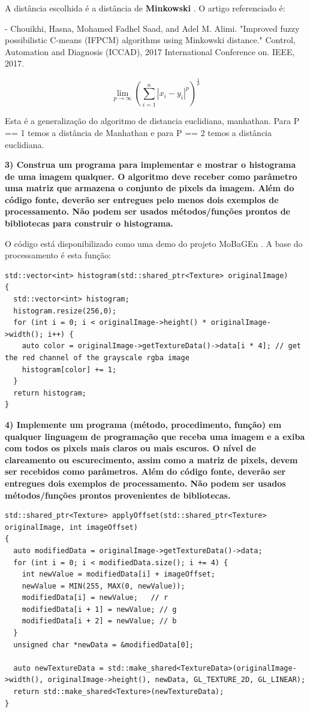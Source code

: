 \documentclass[a4paper]{sbgames}               %
\begin{document}
A distância escolhida é a distância de \textbf{Minkowski} \cite{chouikhi2017improved}. O artigo referenciado é:

- Chouikhi, Hasna, Mohamed Fadhel Saad, and Adel M. Alimi. "Improved fuzzy possibilistic C-means (IFPCM) algorithms using Minkowski distance." Control, Automation and Diagnosis (ICCAD), 2017 International Conference on. IEEE, 2017.

$$ \lim_{p\to\infty}{\left(\sum_{i=1}^n |x_i-y_i|^p\right)^\frac{1}{p}} $$

Esta é a generalização do algoritmo de distancia euclidiana, manhathan. Para P == 1 temos a distância de Manhathan e para P == 2 temos a distância euclidiana.

\textbf{3) Construa um programa para implementar e mostrar o histograma de uma imagem qualquer. O algoritmo deve receber como parâmetro uma matriz que armazena o conjunto de pixels da imagem. Além do código fonte, deverão ser entregues pelo menos dois exemplos de processamento. Não podem ser usados métodos/funções prontos de bibliotecas para construir o histograma.}

O código está disponibilizado como uma demo do projeto MoBaGEn \cite{Tolstenko2018}. A base do processamento é esta função:
\pagebreak
\begin{lstlisting}
std::vector<int> histogram(std::shared_ptr<Texture> originalImage)
{
  std::vector<int> histogram;
  histogram.resize(256,0);
  for (int i = 0; i < originalImage->height() * originalImage->width(); i++) {
    auto color = originalImage->getTextureData()->data[i * 4]; // get the red channel of the grayscale rgba image
    histogram[color] += 1;
  }
  return histogram;
}
\end{lstlisting}

\textbf{4) Implemente um programa (método, procedimento, função) em qualquer
linguagem de programação que receba uma imagem e a exiba com todos
os pixels mais claros ou mais escuros. O nível de clareamento ou
escurecimento, assim como a matriz de pixels, devem ser recebidos
como parâmetros. Além do código fonte, deverão ser entregues dois
exemplos de processamento. Não podem ser usados métodos/funções
prontos provenientes de bibliotecas.}

\begin{lstlisting}
std::shared_ptr<Texture> applyOffset(std::shared_ptr<Texture> originalImage, int imageOffset)
{
  auto modifiedData = originalImage->getTextureData()->data;
  for (int i = 0; i < modifiedData.size(); i += 4) {
    int newValue = modifiedData[i] + imageOffset;
    newValue = MIN(255, MAX(0, newValue));
    modifiedData[i] = newValue;   // r
    modifiedData[i + 1] = newValue; // g
    modifiedData[i + 2] = newValue; // b
  }
  unsigned char *newData = &modifiedData[0];

  auto newTextureData = std::make_shared<TextureData>(originalImage->width(), originalImage->height(), newData, GL_TEXTURE_2D, GL_LINEAR);
  return std::make_shared<Texture>(newTextureData);
}
\end{lstlisting}
\end{document}
